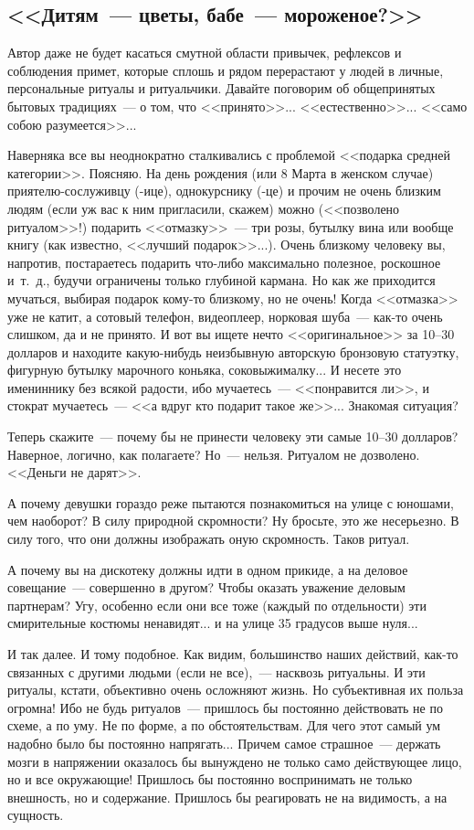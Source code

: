 \documentclass{scrbook}
\newcommand{\flqq}{<<}
\newcommand{\frqq}{>>}
\newcommand{\mdash}{~--- }
\newcommand{\ndash}{--}
\newcommand{\commamdash}{~--- } %
\newcommand{\essaysection}[1]{\subsection*{#1}\nopagebreak}
\begin{document}
\essaysection{{\flqq}Дитям{\mdash}цветы, бабе{\mdash}мороженое?{\frqq}}

Автор даже не будет касаться смутной области привычек, рефлексов и соблюдения примет, которые сплошь и рядом перерастают у людей в личные, персональные ритуалы и ритуальчики. Давайте поговорим об общепринятых бытовых традициях{\mdash}о том, что {\flqq}принято{\frqq}... {\flqq}естественно{\frqq}... {\flqq}само собою разумеется{\frqq}...

Наверняка все вы неоднократно сталкивались с проблемой {\flqq}подарка средней категории{\frqq}. Поясняю. На день рождения (или 8 Марта в женском случае) приятелю-сослуживцу (-ице), однокурснику (-це) и прочим не очень близким людям (если уж вас к ним пригласили, скажем) можно ({\flqq}позволено ритуалом{\frqq}!) подарить {\flqq}отмазку{\frqq}{\mdash}три розы, бутылку вина или вообще книгу (как известно, {\flqq}лучший подарок{\frqq}...). Очень близкому человеку вы, напротив, постараетесь подарить что-либо максимально полезное, роскошное и~т.~д., будучи ограничены только глубиной кармана. Но как же приходится мучаться, выбирая подарок кому-то близкому, но не очень! Когда {\flqq}отмазка{\frqq} уже не катит, а сотовый телефон, видеоплеер, норковая шуба{\mdash}как-то очень слишком, да и не принято. И вот вы ищете нечто {\flqq}оригинальное{\frqq} за 10{\ndash}30 долларов и находите какую-нибудь неизбывную авторскую бронзовую статуэтку, фигурную бутылку марочного коньяка, соковыжималку... И несете это имениннику без всякой радости, ибо мучаетесь{\mdash}{\flqq}понравится ли{\frqq}, и стократ мучаетесь{\mdash}{\flqq}а вдруг кто подарит такое же{\frqq}... Знакомая ситуация?

Теперь скажите{\mdash}почему бы не принести человеку эти самые 10{\ndash}30 долларов? Наверное, логично, как полагаете? Но{\mdash}нельзя. Ритуалом не дозволено. {\flqq}Деньги не дарят{\frqq}.

А почему девушки гораздо реже пытаются познакомиться на улице с юношами, чем наоборот? В силу природной скромности? Ну бросьте, это же несерьезно. В силу того, что они должны изображать оную скромность. Таков ритуал.

А почему вы на дискотеку должны идти в одном прикиде, а на деловое совещание{\mdash}совершенно в другом? Чтобы оказать уважение деловым партнерам? Угу, особенно если они все тоже (каждый по отдельности) эти смирительные костюмы ненавидят... и на улице 35 градусов выше нуля...

И так далее. И тому подобное. Как видим, большинство наших действий, как-то связанных с другими людьми (если не все),{\commamdash}насквозь ритуальны. И эти ритуалы, кстати, объективно очень осложняют жизнь. Но субъективная их польза огромна! Ибо не будь ритуалов{\mdash}пришлось бы постоянно действовать не по схеме, а по уму. Не по форме, а по обстоятельствам. Для чего этот самый ум надобно было бы постоянно напрягать... Причем самое страшное{\mdash}держать мозги в напряжении оказалось бы вынуждено не только само действующее лицо, но и все окружающие! Пришлось бы постоянно воспринимать не только внешность, но и содержание. Пришлось бы реагировать не на видимость, а на сущность.
\end{document}
